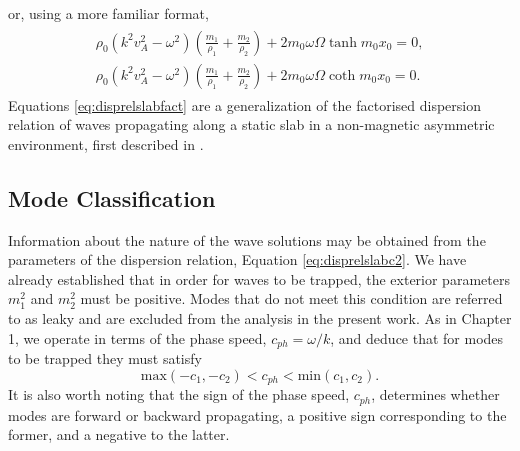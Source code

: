 \documentclass[12pt]{ociamthesis}
\begin{document}
%
or, using a more familiar format,
%
\begin{align}
\begin{split}
\label{eq:disprelslabfact}
\rho_0 (k^2 v_A^2 - \omega^2) \left( \frac{m_1}{\rho_1} + \frac{m_2}{\rho_2} \right)
+ 2 m_0 \omega \Omega \tanh m_0 x_0 = 0,
\\
\rho_0 (k^2 v_A^2 - \omega^2) \left( \frac{m_1}{\rho_1} + \frac{m_2}{\rho_2} \right)
+ 2 m_0 \omega \Omega \coth m_0 x_0 = 0.
\end{split}
\end{align}
%
Equations \eqref{eq:disprelslabfact} are a generalization of the factorised dispersion relation of waves propagating along a static slab in a non-magnetic asymmetric environment, first described in \cite{Allcock2017}.



\subsection{Mode Classification}
\label{subsec:modes}

Information about the nature of the wave solutions may be obtained from the parameters of the dispersion relation, Equation \eqref{eq:disprelslabc2}.
We have already established that in order for waves to be trapped, the exterior parameters $m_1^2$ and $m_2^2$ must be positive.
Modes that do not meet this condition are referred to as leaky and are excluded from the analysis in the present work.
As in Chapter 1, we operate in terms of the phase speed, $c_{ph} = \omega / k$, and deduce that for modes to be trapped they must satisfy
%
\begin{equation}
\textrm{max}(-c_1, -c_2) < c_{ph} < \textrm{min}(c_1, c_2).
\end{equation}
%
It is also worth noting that the sign of the phase speed, $c_{ph}$, determines whether modes are forward or backward propagating, a positive sign corresponding to the former, and a negative to the latter.
\end{document}

